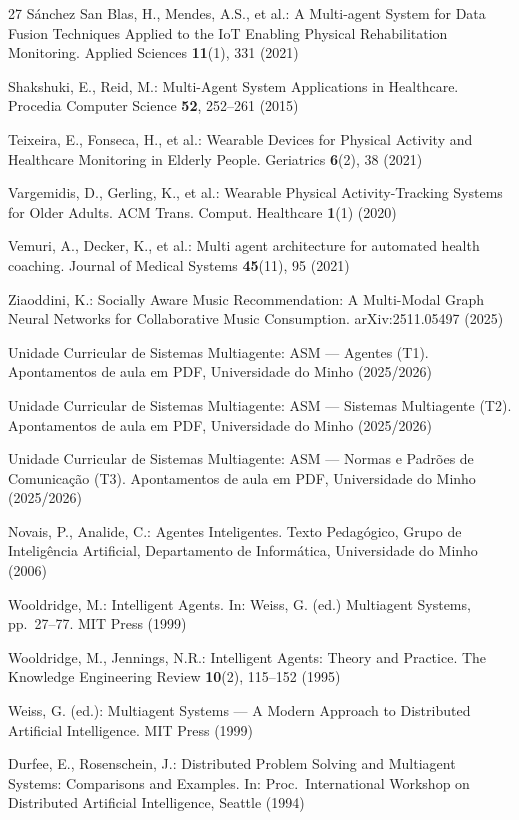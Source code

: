 \documentclass[runningheads]{llncs}
\begin{document}
\begin{thebibliography}{27}
S\'{a}nchez San Blas, H., Mendes, A.S., et al.: A Multi-agent System for Data Fusion Techniques Applied to the IoT Enabling Physical Rehabilitation Monitoring. Applied Sciences \textbf{11}(1), 331 (2021)

Shakshuki, E., Reid, M.: Multi-Agent System Applications in Healthcare. Procedia Computer Science \textbf{52}, 252--261 (2015)

Teixeira, E., Fonseca, H., et al.: Wearable Devices for Physical Activity and Healthcare Monitoring in Elderly People. Geriatrics \textbf{6}(2), 38 (2021)

Vargemidis, D., Gerling, K., et al.: Wearable Physical Activity-Tracking Systems for Older Adults. ACM Trans. Comput. Healthcare \textbf{1}(1) (2020)

Vemuri, A., Decker, K., et al.: Multi agent architecture for automated health coaching. Journal of Medical Systems \textbf{45}(11), 95 (2021)

Ziaoddini, K.: Socially Aware Music Recommendation: A Multi-Modal Graph Neural Networks for Collaborative Music Consumption. arXiv:2511.05497 (2025)

Unidade Curricular de Sistemas Multiagente: ASM --- Agentes (T1). Apontamentos de aula em PDF, Universidade do Minho (2025/2026)

Unidade Curricular de Sistemas Multiagente: ASM --- Sistemas Multiagente (T2). Apontamentos de aula em PDF, Universidade do Minho (2025/2026)

Unidade Curricular de Sistemas Multiagente: ASM --- Normas e Padrões de Comunicação (T3). Apontamentos de aula em PDF, Universidade do Minho (2025/2026)

Novais, P., Analide, C.: Agentes Inteligentes. Texto Pedagógico, Grupo de Inteligência Artificial, Departamento de Informática, Universidade do Minho (2006)

Wooldridge, M.: Intelligent Agents. In: Weiss, G. (ed.) Multiagent Systems, pp.~27--77. MIT Press (1999)

Wooldridge, M., Jennings, N.R.: Intelligent Agents: Theory and Practice. The Knowledge Engineering Review \textbf{10}(2), 115--152 (1995)

Weiss, G. (ed.): Multiagent Systems --- A Modern Approach to Distributed Artificial Intelligence. MIT Press (1999)

Durfee, E., Rosenschein, J.: Distributed Problem Solving and Multiagent Systems: Comparisons and Examples. In: Proc.\ International Workshop on Distributed Artificial Intelligence, Seattle (1994)

\end{thebibliography}
\end{document}
